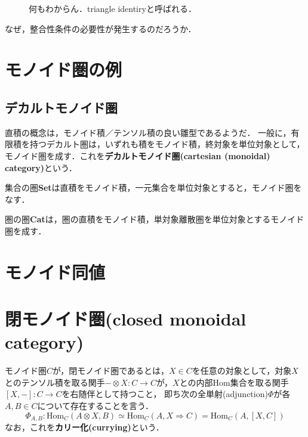 \documentclass[uplatex, dvipdfmx]{jsreport}
\begin{document}
\begin{figure}[h]\begin{center}\caption{何もわからん．triangle identiryと呼ばれる．\label{def-monoidal-2}}
\end{center}\end{figure}

なぜ，整合性条件の必要性が発生するのだろうか．

\section{モノイド圏の例}

\subsection{デカルトモノイド圏}
直積の概念は，モノイド積／テンソル積の良い雛型であるようだ．
一般に，有限積を持つデカルト圏は，いずれも積をモノイド積，終対象を単位対象として，モノイド圏を成す．これを\textbf{デカルトモノイド圏(cartesian (monoidal) category)}という．

集合の圏\textbf{Set}は直積をモノイド積，一元集合を単位対象とすると，モノイド圏をなす．

圏の圏\textbf{Cat}は，圏の直積をモノイド積，単対象離散圏を単位対象とするモノイド圏を成す．

\section{モノイド同値}

\section{閉モノイド圏(closed monoidal category)}
\begin{definition}\rm{}
    モノイド圏$C$が，閉モノイド圏であるとは，$X\in C$を任意の対象として，対象$X$とのテンソル積を取る関手$-\otimes X:C\to C$が，$X$との内部Hom集合を取る関手$[X,-]:C\to C$を右随伴として持つこと，
    即ち次の全単射(adjunction)$\Phi$が各$A,B\in C$について存在することを言う．
    $$\Phi_{A,B}:\mathrm{Hom}_C(A\otimes X,B)\simeq \mathrm{Hom}_C(A,X\Rightarrow C) = \mathrm{Hom}_C(A,[X,C])$$
    なお，これを\textbf{カリー化(currying)}という．
\end{definition}
\end{document}
